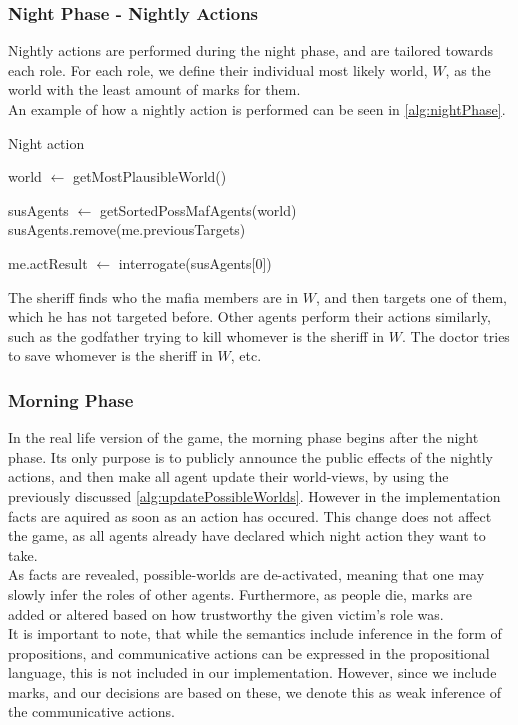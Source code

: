 \subsubsection{Night Phase - Nightly
	Actions}\label{sec:nightPhaseNightlyActions}
Nightly actions are performed during the night phase, and are tailored towards
each role. For each role, we define their individual most likely world, $W$, as
the world with the least amount of marks for them. \\ An example of how a
nightly action is performed can be seen in \cref{alg:nightPhase}.
\begin{algorithm}[H]
	\caption{Night action}
	\begin{algorithmic}[1]
		\State world $\gets$ getMostPlausibleWorld()

		\State susAgents $\gets$ getSortedPossMafAgents(world)
		\State susAgents.remove(me.previousTargets)

		\State me.actResult $\gets$ interrogate(susAgents[0])
		\EndIf
		\EndFunction

		\Statex
	\end{algorithmic}\label{alg:nightPhase}
\end{algorithm}
\setcounter{algorithmcaption}{7}
The sheriff finds who the mafia members are in $W$, and then targets one of
them, which he has not targeted before. Other agents perform their actions
similarly, such as the godfather trying to kill whomever is the sheriff in $W$.
The doctor tries to save whomever is the sheriff in $W$, etc.

\subsubsection{Morning Phase}\label{sec:morningPhase}
In the real life version of the game, the morning phase begins after the night
phase. Its only purpose is to publicly announce the public effects of the
nightly actions, and then make all agent update their world-views, by using the
previously discussed \cref{alg:updatePossibleWorlds}. However in the
implementation facts are aquired as soon as an action has occured. This
change does not affect the game, as all agents already have declared which
night action they want to take.\\ 
As facts are revealed, possible-worlds are
de-activated, meaning that one may slowly infer the roles of other agents.
Furthermore, as people die, marks are added or altered based on how trustworthy
the given victim's role was. \\ It is important to note, that while the
semantics include inference in the form of propositions, and communicative
actions can be expressed in the propositional language, this is not included in
our implementation. However, since we include marks, and our decisions are
based on these, we denote this as weak inference of the communicative actions.

